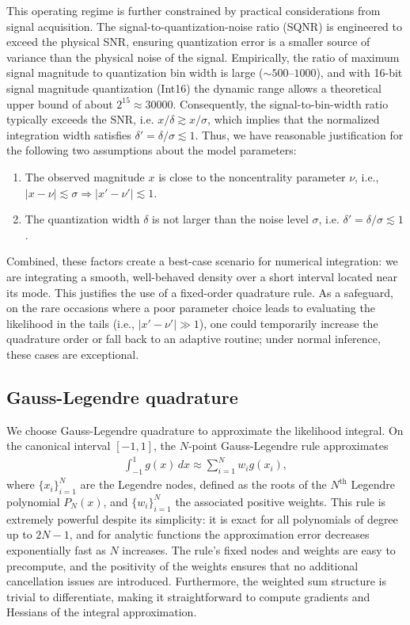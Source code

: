 \documentclass{article}
\begin{document}
This operating regime is further constrained by practical considerations from signal acquisition.
The signal-to-quantization-noise ratio (SQNR) is engineered to exceed the physical SNR, ensuring quantization error is a smaller source of variance than the physical noise of the signal.
Empirically, the ratio of maximum signal magnitude to quantization bin width is large ($\sim\!500\text{--}1000$), and with 16-bit signal magnitude quantization (Int16) the dynamic range allows a theoretical upper bound of about $2^{15} \approx 30000$.
Consequently, the signal-to-bin-width ratio typically exceeds the SNR, i.e. $x/\delta \gtrsim x/\sigma$, which implies that the normalized integration width satisfies $\delta' = \delta/\sigma \lesssim 1$.
Thus, we have reasonable justification for the following two assumptions about the model parameters:
%
\begin{enumerate}
  \item The observed magnitude $x$ is close to the noncentrality parameter $\nu$, i.e., $|x - \nu| \lesssim \sigma \Rightarrow |x' - \nu'| \lesssim 1$.
  \item The quantization width $\delta$ is not larger than the noise level $\sigma$, i.e. $\delta' = \delta / \sigma \lesssim 1$.
\end{enumerate}
%
Combined, these factors create a best-case scenario for numerical integration:
we are integrating a smooth, well-behaved density over a short interval located near its mode.
This justifies the use of a fixed-order quadrature rule.
As a safeguard, on the rare occasions where a poor parameter choice leads to evaluating the likelihood in the tails (i.e., $|x'-\nu'| \gg 1$), one could temporarily increase the quadrature order or fall back to an adaptive routine;
under normal inference, these cases are exceptional.

\subsection{Gauss-Legendre quadrature}

We choose Gauss-Legendre quadrature to approximate the likelihood integral.
On the canonical interval $[-1,1]$, the $N$‑point Gauss-Legendre rule approximates
%
\begin{align}
  \int_{-1}^{1} g(x) \, dx \approx \sum_{i=1}^{N} w_i g(x_i),
\end{align}
%
where $\{x_i\}_{i=1}^N$ are the Legendre nodes, defined as the roots of the $N^\text{th}$ Legendre polynomial $P_N(x)$, and $\{w_i\}_{i=1}^N$ the associated positive weights.
This rule is extremely powerful despite its simplicity:
it is exact for all polynomials of degree up to $2N-1$, and for analytic functions the approximation error decreases exponentially fast as $N$ increases.
The rule's fixed nodes and weights are easy to precompute, and the positivity of the weights ensures that no additional cancellation issues are introduced.
Furthermore, the weighted sum structure is trivial to differentiate, making it straightforward to compute gradients and Hessians of the integral approximation.
\end{document}
